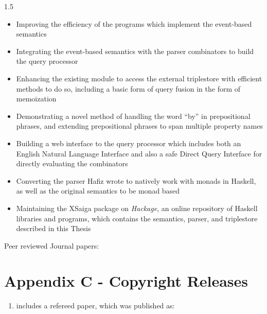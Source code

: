 \documentclass[fleqn, oneside, 12pt]{book}
\theoremstyle{definitionsty}
\newcommand{\uwinonehalfspacelen}{1.5}
\newcommand{\uwindefaultspacelen}{\uwinonehalfspacelen}
\newenvironment{uwindefaultspaceenv}%
{\begin{spacing}{\uwindefaultspacelen}}%
	{\end{spacing}}
\begin{document}
\begin{uwindefaultspaceenv}
\begin{itemize}
	\item Improving the efficiency of the programs which implement the event-based semantics
	\item Integrating the event-based semantics with the parser combinators to build the query processor
	\item Enhancing the existing module to access the external triplestore with efficient methods to do so, including a basic form of query fusion in the form of memoization
	\item Demonstrating a novel method of handling the word ``by'' in prepositional phrases, and extending prepositional phrases to span multiple property names
	\item Building a web interface to the query processor which includes both an English Natural Language Interface and also a safe Direct Query Interface for directly evaluating the combinators
	\item Converting the parser Hafiz wrote\cite{frosthafiz2008} to natively work with monads in Haskell, as well as the original semantics\cite{frost2014demonstration} to be monad based
	\item Maintaining the XSaiga package on {\em Hackage}\cite{XSaiga:2016}, an online repository of Haskell libraries and programs, which contains the semantics, parser, and triplestore described in this Thesis
\end{itemize}

Peer reviewed Journal papers:

\cite{peelar2019real} 



\section*{Appendix C - Copyright Releases}


\begin{enumerate}
	\item { includes a refereed paper, which was published as:

}
\end{enumerate}
\end{uwindefaultspaceenv}
\end{document}

